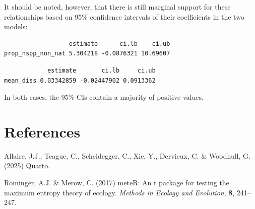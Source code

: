 \documentclass[
  letterpaper,
  DIV=11,
  numbers=noendperiod]{scrartcl}
\newenvironment{Shaded}{\begin{snugshade}}{\end{snugshade}}
\newcommand{\AttributeTok}[1]{\textcolor[rgb]{0.40,0.45,0.13}{#1}}
\newcommand{\CommentTok}[1]{\textcolor[rgb]{0.37,0.37,0.37}{#1}}
\newcommand{\ConstantTok}[1]{\textcolor[rgb]{0.56,0.35,0.01}{#1}}
\newcommand{\DecValTok}[1]{\textcolor[rgb]{0.68,0.00,0.00}{#1}}
\newcommand{\FunctionTok}[1]{\textcolor[rgb]{0.28,0.35,0.67}{#1}}
\newcommand{\NormalTok}[1]{\textcolor[rgb]{0.00,0.23,0.31}{#1}}
\newcommand{\SpecialCharTok}[1]{\textcolor[rgb]{0.37,0.37,0.37}{#1}}
\newlength{\cslhangindent}
\newenvironment{CSLReferences}[2] %
 {\begin{list}{}{%
  \setlength{\itemindent}{0pt}
  \setlength{\leftmargin}{0pt}
  \setlength{\parsep}{0pt}
  \ifodd #1
   \setlength{\leftmargin}{\cslhangindent}
   \setlength{\itemindent}{-1\cslhangindent}
  \fi
  \setlength{\itemsep}{#2\baselineskip}}}
 {\end{list}}
\begin{document}
It should be noted, however, that there is still marginal support for
these relationships based on 95\% confidence intervals of their
coefficients in the two models:

\begin{Shaded}
\end{Shaded}

\begin{verbatim}
                  estimate      ci.lb    ci.ub
prop_nspp_non_nat 5.304218 -0.0876321 10.69607
\end{verbatim}

\begin{Shaded}
\end{Shaded}

\begin{verbatim}
            estimate       ci.lb     ci.ub
mean_diss 0.03342859 -0.02447902 0.0913362
\end{verbatim}

In both cases, the 95\% CIs contain a majority of positive values.

\section*{References}\label{references}

\label{refs}
\begin{CSLReferences}{1}{0}
Allaire, J.J., Teague, C., Scheidegger, C., Xie, Y., Dervieux, C. \&
Woodhull, G. (2025)
\href{https://github.com/quarto-dev/quarto-cli}{{Quarto}}.

Rominger, A.J. \& Merow, C. (2017) meteR: An r package for testing the
maximum entropy theory of ecology. \emph{Methods in Ecology and
Evolution}, \textbf{8}, 241--247.

\end{CSLReferences}
\end{document}

